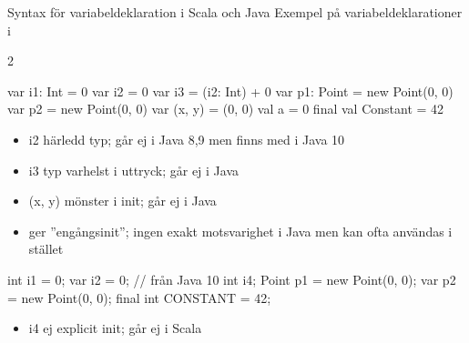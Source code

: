 \begin{Slide}{Syntax för variabeldeklaration i Scala och Java}\SlideFontSmall
Exempel på variabeldeklarationer i
\begin{multicols}{2}
\noindent{}
\begin{CodeSmall}[basicstyle=\ttfamily\SlideFontSize{7}{10},backgroundcolor=\color{white},
  frame=none]
  var i1: Int = 0
  var i2 = 0
  var i3 = (i2: Int) + 0
  var p1: Point = new Point(0, 0)
  var p2 = new Point(0, 0)
  var (x, y) = (0, 0)
  val a = 0
  final val Constant = 42
\end{CodeSmall}
\begin{itemize}\SlideFontTiny
\item i2 härledd typ; går ej i Java 8,9 men finns med  i Java 10

\item i3 typ varhelst i uttryck; går ej i Java

\item (x, y) mönster i init; går ej i Java

\item {} ger ''engångsinit''; ingen exakt motsvarighet i Java men  kan ofta användas i stället
\end{itemize}

\columnbreak

\noindent{}
\begin{CodeSmall}[language=Java,morekeywords={var},basicstyle=\ttfamily\SlideFontSize{7}{10},backgroundcolor=\color{white},
  frame=none]
  int i1 = 0;
  var i2 = 0; // från Java 10
  int i4;
  Point p1 = new Point(0, 0);
  var p2 = new Point(0, 0); 
  final int CONSTANT = 42;
\end{CodeSmall}
\begin{itemize}\SlideFontTiny
\item i4 ej explicit init; går ej i Scala
\end{itemize}
\end{multicols}

\end{Slide}


